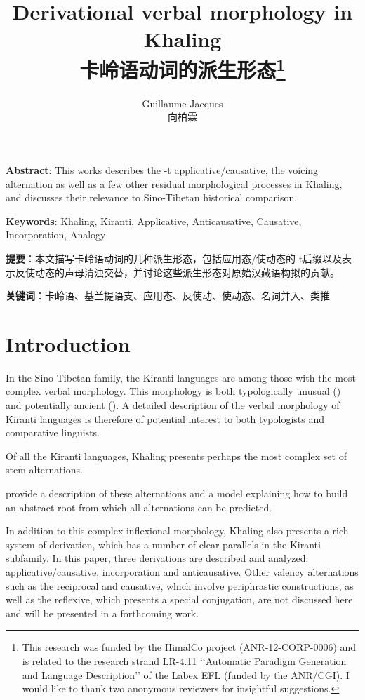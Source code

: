 \documentclass[oldfontcommands,oneside,a4paper,11pt]{article}
\newcommand{\zh}[1]{{\cn #1}}
\begin{document}
 


\title{Derivational verbal morphology in Khaling \\\zh{卡岭语动词的派生形态}\footnote{This research was funded by the HimalCo project (ANR-12-CORP-0006) and is related to the research strand LR-4.11 ‘‘Automatic Paradigm Generation and Language Description’’ of the Labex EFL (funded by the ANR/CGI). I would like to thank two anonymous reviewers for insightful suggestions.  } }
\author{Guillaume Jacques \\\zh{向柏霖}}
\maketitle

\textbf{Abstract}: This works describes the -t applicative/causative, the voicing alternation as well as a few other residual morphological processes in Khaling, and discusses their relevance to Sino-Tibetan historical comparison.

\textbf{Keywords}: Khaling, Kiranti, Applicative, Anticausative, Causative, Incorporation,  Analogy

\zh{\textbf{提要}：本文描写卡岭语动词的几种派生形态，包括应用态/使动态的-t后缀以及表示反使动态的声母清浊交替，并讨论这些派生形态对原始汉藏语构拟的贡献。}

\zh{\textbf{关键词}：卡岭语、基兰提语支、应用态、反使动、使动态、名词并入、类推}

\section{Introduction}
In the Sino-Tibetan family, the Kiranti languages are among those with the most complex verbal morphology. This morphology is both typologically unusual (\citealt{bickel07chintang}) and potentially ancient (\citealt{jacques12agreement, delancey14second}). A detailed description of the verbal morphology of Kiranti languages is therefore of potential interest to both typologists and comparative linguists.

Of all the Kiranti languages, Khaling presents perhaps the  most complex set of stem alternations. 

 \citet{jacques12khaling} provide a description of these alternations and a model explaining how to build an abstract root  from which all alternations can be predicted.

In addition to this complex inflexional morphology, Khaling also presents a rich system of derivation, which has a number of clear parallels in the Kiranti subfamily. In this paper, three derivations are described and analyzed: applicative/causative, incorporation and anticausative. Other valency alternations such as the reciprocal and causative, which involve periphrastic constructions, as well as the reflexive, which presents a special conjugation, are not discussed here and will be presented in a forthcoming work.
\end{document}
